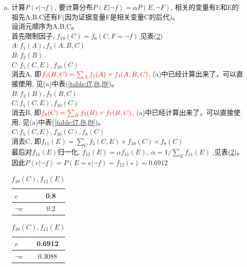\documentclass[a4paper, 11pt]{article}
\begin{document}
\begin{enumerate}
\begin{enumerate}[(a)]
\begin{table}[!htbp]
        \caption{$f_{7}(B,C),f_{8}(C),f_{9}(E)$}
        \label{table:f7,f8,f9}
      \end{table}
      \item 计算$P(e|\lnot f)$, 要计算分布$P(E|\lnot f)=\alpha P(E,\lnot F)$,
      相关的变量有E和E的祖先A,B,C还有F(因为证据变量F是相关变量C的后代)。\\
      设消元顺序为A,B,C。\\
      首先限制因子, $f_{10}(C) = f_{6}(C,F=\lnot f)$,见表(\ref{table:f10,f12})\\
      $A: f_{1}(A), f_{3}(A,B,C)$\\
      $B: f_{2}(B)$\\
      $C: f_{5}(C,E),f_{10}(C)$\\
      消去A, 即$\textcolor{red}{f_{7}(B,C) = \sum_{A}f_{1}(A) \times f_{3}(A,B,C)}$, (a)中已经计算出来了，可以直接使用,
      见(a)中表(\ref{table:f7,f8,f9})。\\
      $B: f_{2}(B), f_{7}(B,C)$\\
      $C: f_{5}(C,E),f_{10}(C)$\\
      消去B, 即$\textcolor{red}{f_{8}(C) = \sum_{B}f_{2}(B) \times f_{7}(B,C)}$, (a)中已经计算出来了，可以直接使用,
      见(a)中表(\ref{table:f7,f8,f9})。\\
      $C: f_{5}(C,E),f_{10}(C),f_{8}(C)$\\
      消去C, 即$f_{11}(E) = \sum_{C}f_{5}(C,E)\times f_{10}(C)\times f_{8}(C)$\\
      最后对$f_{11}(E)$归一化, $f_{12}(E) = \alpha f_{11}(E),\ \alpha = 1/\sum_{E}f_{11}(E)$
      ,见表(\ref{table:f10,f12})。
      \\因此$P(e|\lnot f) = P(E=e|\lnot f) = f_{12}(e) = 0.6912$
      \begin{table}[!ht]
        \centering
        \begin{tabular}{|l|c|}
          \hline
          $c$&0.8\\
          \hline
          $\lnot c$&0.2\\
          \hline
        \end{tabular}
        \begin{tabular}{|l|c|}
          \hline
          $e$&0.6912\\
          \hline
          $\lnot e$&0.3088\\
          \hline
        \end{tabular}
        \caption{$f_{10}(C),f_{12}(E)$}
        \label{table:f10,f12}
      \end{table}
    \end{enumerate}
\end{enumerate}



%
%
\end{document}
